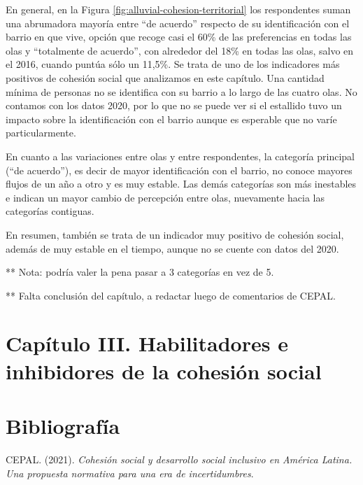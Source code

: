 \documentclass[
  12pt,
]{book}
\begin{document}
En general, en la Figura \ref{fig:alluvial-cohesion-territorial} los respondentes suman una abrumadora mayoría entre ``de acuerdo'' respecto de su identificación con el barrio en que vive, opción que recoge casi el 60\% de las preferencias en todas las olas y ``totalmente de acuerdo'', con alrededor del 18\% en todas las olas, salvo en el 2016, cuando puntúa sólo un 11,5\%. Se trata de uno de los indicadores más positivos de cohesión social que analizamos en este capítulo. Una cantidad mínima de personas no se identifica con su barrio a lo largo de las cuatro olas. No contamos con los datos 2020, por lo que no se puede ver si el estallido tuvo un impacto sobre la identificación con el barrio aunque es esperable que no varíe particularmente.

En cuanto a las variaciones entre olas y entre respondentes, la categoría principal (``de acuerdo''), es decir de mayor identificación con el barrio, no conoce mayores flujos de un año a otro y es muy estable. Las demás categorías son más inestables e indican un mayor cambio de percepción entre olas, nuevamente hacia las categorías contiguas.

En resumen, también se trata de un indicador muy positivo de cohesión social, además de muy estable en el tiempo, aunque no se cuente con datos del 2020.

** Nota: podría valer la pena pasar a 3 categorías en vez de 5.

** Falta conclusión del capítulo, a redactar luego de comentarios de CEPAL.

\hypertarget{capuxedtulo-iii.-habilitadores-e-inhibidores-de-la-cohesiuxf3n-social}{%
\chapter{Capítulo III. Habilitadores e inhibidores de la cohesión social}\label{capuxedtulo-iii.-habilitadores-e-inhibidores-de-la-cohesiuxf3n-social}}

\hypertarget{bibliografuxeda}{%
\chapter*{Bibliografía}\label{bibliografuxeda}}

\hypertarget{refs}{}
\leavevmode\hypertarget{ref-cepal_cohesion_2021}{}%
CEPAL. (2021). \emph{Cohesión social y desarrollo social inclusivo en América Latina. Una propuesta normativa para una era de incertidumbres}.
\end{document}
